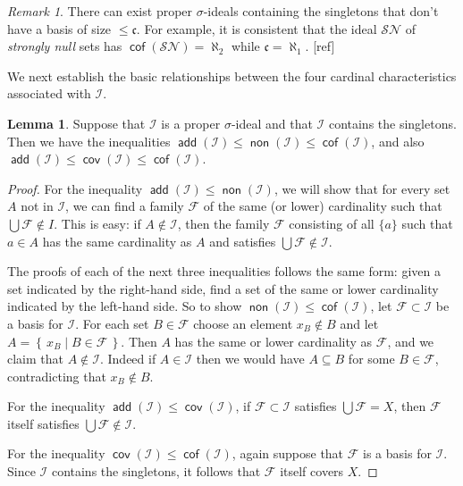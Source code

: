 \documentclass[11pt,oneside]{amsart}
\newcommand{\set}[1]{\left\{\,#1\,\right\}}
\DeclareMathOperator{\add}{\mathsf{add}}
\DeclareMathOperator{\non}{\mathsf{non}}
\DeclareMathOperator{\cov}{\mathsf{cov}}
\DeclareMathOperator{\cof}{\mathsf{cof}}
\theoremstyle{definition}
\newtheorem{lem}[thm]{Lemma}
\theoremstyle{definition}
\theoremstyle{remark}
\newtheorem{rem}[thm]{Remark}
\begin{document}
\begin{rem}
  There can exist proper $\sigma$-ideals containing the singletons that don't have a basis of size $\leq\mathfrak c$. For example, it is consistent that the ideal $\mathcal{SN}$ of \emph{strongly null} sets has $\cof(\mathcal{SN})=\aleph_2$ while $\mathfrak c=\aleph_1$. [ref]
\end{rem}

We next establish the basic relationships between the four cardinal characteristics associated with $\mathcal I$.

\begin{lem}
  Suppose that $\mathcal I$ is a proper $\sigma$-ideal and that $\mathcal I$ contains the singletons. Then we have the inequalities $\add(\mathcal I)\leq\non(\mathcal I)\leq\cof(\mathcal I)$, and also $\add(\mathcal I)\leq\cov(\mathcal I)\leq\cof(\mathcal I)$.
\end{lem}

\begin{proof}
  For the inequality $\add(\mathcal{I})\leq\non(\mathcal{I})$, we will show that for every set $A$ not in $\mathcal I$, we can find a family $\mathcal F$ of the same (or lower) cardinality such that $\bigcup\mathcal F\notin I$. This is easy: if $A\notin\mathcal I$, then the family $\mathcal F$ consisting of all $\{a\}$ such that $a\in A$ has the same cardinality as $A$ and satisfies $\bigcup\mathcal F\notin\mathcal I$.

  The proofs of each of the next three inequalities follows the same form: given a set indicated by the right-hand side, find a set of the same or lower cardinality indicated by the left-hand side. So to show $\non(\mathcal I)\leq\cof(\mathcal I)$, let $\mathcal F\subset \mathcal{I}$ be a basis for $\mathcal I$. For each set $B\in\mathcal F$ choose an element $x_B\notin B$ and let $A=\set{x_B\mid B\in\mathcal F}$. Then $A$ has the same or lower cardinality as $\mathcal F$, and we claim that $A\notin\mathcal{I}$. Indeed if $A\in\mathcal{I}$ then we would have $A\subseteq B$ for some $B\in\mathcal F$, contradicting that $x_B\notin B$.

  For the inequality $\add(\mathcal I)\leq\cov(\mathcal I)$, if $\mathcal F\subset\mathcal{I}$ satisfies $\bigcup\mathcal F=X$, then $\mathcal F$ itself satisfies $\bigcup\mathcal F\notin\mathcal I$.

  For the inequality $\cov(\mathcal I)\leq\cof(\mathcal I)$, again suppose that $\mathcal{F}$ is a basis for $\mathcal I$. Since $\mathcal I$ contains the singletons, it follows that $\mathcal F$ itself covers $X$.
\end{proof}
\end{document}
